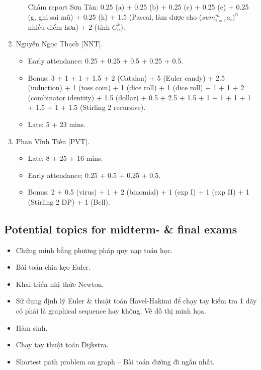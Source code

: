\documentclass{article}
\begin{document}
\begin{enumerate}
\begin{itemize}
		Chấm report Sơn Tân: 0.25 (a) + 0.25 (b) + 0.25 (c) + 0.25 (e) + 0.25 (g, ghi sai mũ) + 0.25 (h) + 1.5 (Pascal, làm được cho ($sum_{i=1}^m a_i)^n$ nhiều điểm hơn) + 2 (tính $C_n^k$).
	\end{itemize}
	\item {\sc Nguyễn Ngọc Thạch [NNT].}
	\begin{itemize}
		\item Early attendance: 0.25 + 0.25 + 0.5 + 0.25 + 0.5.
		\item Bonus: 3 + 1 + 1 + 1.5 + 2 (Catalan) + 5 (Euler candy) + 2.5 (induction) + 1 (toss coin) + 1 (dice roll) + 1 (dice roll) + 1 + 1 + 2 (combinator identity) + 1.5 (dollar) + 0.5 + 2.5 + 1.5 + 1 + 1 + 1 + 1 + 1.5 + 1 + 1.5 (Stirling 2 recursive).
		\item Late: 5 + 23 mins.
	\end{itemize}
	\item {\sc Phan Vĩnh Tiến [PVT].}
	\begin{itemize}
		\item Late: 8 + 25 + 16 mins.
		\item Early attendance: 0.25 + 0.5 + 0.25 + 0.5.
		\item Bonus: 2 + 0.5 (virus) + 1 + 2 (binomial) + 1 (exp I) + 1 (exp II) + 1 (Stirling 2 DP) + 1 (Bell).
	\end{itemize}
\end{enumerate}


\subsection{Potential topics for midterm- \& final exams}

\begin{itemize}
	\item Chứng minh bằng phương pháp quy nạp toán học.
	\item Bài toán chia kẹo Euler.
	\item Khai triển nhị thức Newton.
	\item Sử dụng định lý Euler \& thuật toán Havel-Hakimi để chạy tay kiểm tra 1 dãy có phải là graphical sequence hay không. Vẽ đồ thị minh họa.
	\item Hàm sinh.
	\item Chạy tay thuật toán Dijkstra.
	\item Shortest path problem on graph -- Bài toán đường đi ngắn nhất.
\end{itemize}
\end{document}
